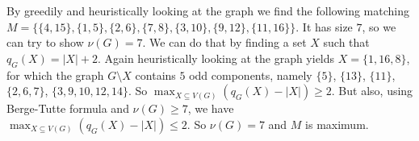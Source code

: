 \newcommand{\sheet}{4}




\maketitle

\begin{exercise}{1}
    By greedily and heuristically looking at the graph we find the following
    matching $M = \{ \{4, 15\}, \{1, 5\}, \{2, 6\}, \{7, 8\}, \{3, 10\}, \{9,
    12\}, \{11, 16\} \}$. It has size $7$, so we can try to show $\nu(G) = 7$.
    We can do that by finding a set $X$ such that $q_G(X) = |X| + 2$. Again
    heuristically looking at the graph yields $X = \{1, 16, 8\}$, for which the
    graph $G \setminus X$ contains $5$ odd components, namely $\{5\}$, $\{13\}$,
    $\{11\}$, $\{2, 6, 7\}$, $\{3, 9, 10, 12, 14\}$. So $\max_{X \subseteq V(G)}
    (q_G(X) - |X|) \geq 2$. But also, using Berge-Tutte formula and $\nu(G) \geq
    7$, we have $\max_{X \subseteq V(G)} (q_G(X) - |X|) \leq 2$. So $\nu(G) = 7$
    and $M$ is maximum.
\end{exercise}


